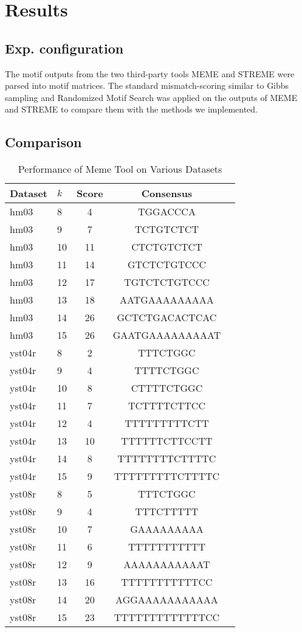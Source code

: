 \documentclass{report}
\begin{document}
\chapter{Results}
    \section{Exp. configuration}
    The motif outputs from the two third-party tools MEME and STREME were parsed into motif matrices. The standard mismatch-scoring similar to Gibbs sampling and Randomized Motif Search was applied on the outputs of MEME and STREME to compare them with the methods we implemented.

\newpage
\section{Comparison}
    
\begin{table}[htbp]
\centering
\caption{Performance of Meme Tool on Various Datasets}
\begin{tabular}{@{}llccc@{}}
\hline
\textbf{Dataset} & \textbf{\(k\)} & \textbf{Score} & \textbf{Consensus} \\ \midrule
hm03 & 8 & 4 & TGGACCCA \\
hm03 & 9 & 7 & TCTGTCTCT \\
hm03 & 10 & 11 & CTCTGTCTCT \\
hm03 & 11 & 14 & GTCTCTGTCCC \\
hm03 & 12 & 17 & TGTCTCTGTCCC \\
hm03 & 13 & 18 & AATGAAAAAAAAA \\
hm03 & 14 & 26 & GCTCTGACACTCAC \\
hm03 & 15 & 26 & GAATGAAAAAAAAAT \\
yst04r & 8 & 2 & TTTCTGGC \\
yst04r & 9 & 4 & TTTTCTGGC \\
yst04r & 10 & 8 & CTTTTCTGGC \\
yst04r & 11 & 7 & TCTTTTCTTCC \\
yst04r & 12 & 4 & TTTTTTTTTCTT \\
yst04r & 13 & 10 & TTTTTTCTTCCTT \\
yst04r & 14 & 8 & TTTTTTTTCTTTTC \\
yst04r & 15 & 9 & TTTTTTTTTCTTTTC \\
yst08r & 8 & 5 & TTTCTGGC \\
yst08r & 9 & 4 & TTTCTTTTT \\
yst08r & 10 & 7 & GAAAAAAAAA \\
yst08r & 11 & 6 & TTTTTTTTTTT \\
yst08r & 12 & 9 & AAAAAAAAAAAT \\
yst08r & 13 & 16 & TTTTTTTTTTTCC \\
yst08r & 14 & 20 & AGGAAAAAAAAAAA \\
yst08r & 15 & 23 & TTTTTTTTTTTTTCC \\ \bottomrule
\hline
\end{tabular}
\end{table}
\end{document}
